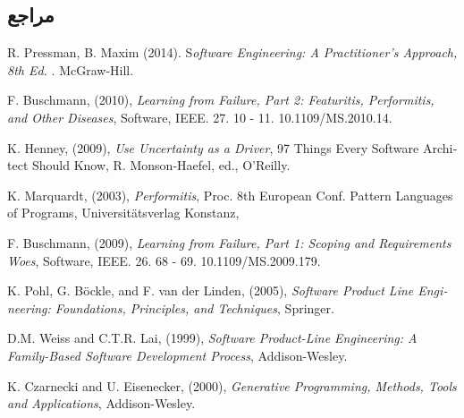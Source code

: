 {\begin{enumerate}[a)]
 
\end{enumerate}
	

\subsection*{مراجع}

\begin{latin}
	\begingroup
	\renewcommand{\section}[2]{}%
	
\begin{thebibliography}{9}

	R. Pressman,   B. Maxim (2014).
	S\textit{oftware Engineering: A Practitioner’s Approach, 8th Ed. }.
	McGraw-Hill.

	
	
	F. Buschmann, (2010), \textit{Learning from Failure, Part 2: Featuritis, Performitis, and Other Diseases}, Software, IEEE. 27. 10 - 11. 10.1109/MS.2010.14. 
	
	
	K. Henney, (2009), \textit{Use Uncertainty as a Driver}, 97 Things Every Software Architect Should Know, R. Monson-Haefel, ed., O’Reilly.
	
	K. Marquardt, (2003), \textit{Performitis}, Proc. 8th European Conf. Pattern Languages of Programs, Universitätsverlag Konstanz,

F. Buschmann, (2009), \textit{Learning from Failure, Part 1: Scoping and Requirements Woes}, Software, IEEE. 26. 68 - 69. 10.1109/MS.2009.179. 
	
K. Pohl, G. Böckle, and F. van der Linden, (2005), \textit{Software Product Line Engineering: Foundations, Principles, and Techniques}, Springer.
	
	
	D.M. Weiss and C.T.R. Lai, (1999), \textit{Software Product-Line Engineering: A Family-Based Software Development Process}, Addison-Wesley.
	
	K. Czarnecki and U. Eisenecker, (2000), \textit{Generative Programming, Methods, Tools and Applications}, Addison-Wesley.

	 

	  

	 
	
	
\end{thebibliography}
\endgroup
\end{latin}

}
